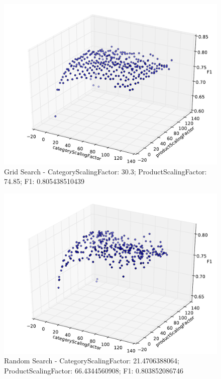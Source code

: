 \documentclass{article}
\begin{document}
\begin{figure}[!htb]
\centering
\includegraphics[width=\textwidth]{eclipse/g_eclipse.pdf}
\caption{Grid Search - CategoryScalingFactor: 30.3; ProductScalingFactor: 74.85; F1: 0.805438510439 }
\label{fig:EGrid-Search}
\end{figure}

\begin{figure}[!htb]
\centering
\includegraphics[width=\textwidth]{eclipse/rnd_eclipse.pdf}
\caption{Random Search - CategoryScalingFactor: 21.4706388064; ProductScalingFactor: 66.4344560908; F1: 0.803852086746 }
\label{fig:ERandom-Search}
\end{figure}
\end{document}
